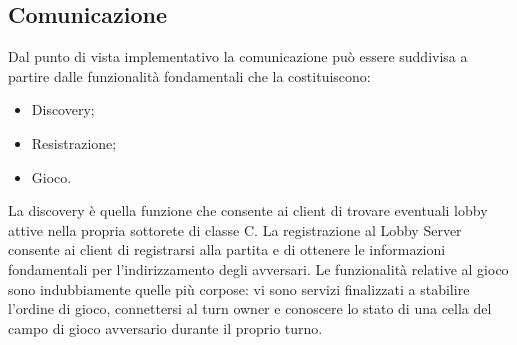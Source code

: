 \subsection{Comunicazione}
Dal punto di vista implementativo la comunicazione può essere suddivisa a 
partire dalle funzionalità fondamentali che la costituiscono:
\begin{itemize}
 \item Discovery;
 \item Resistrazione;
 \item Gioco.
\end{itemize}
La discovery è quella funzione che consente ai client di trovare eventuali 
lobby attive nella propria sottorete di classe C. La registrazione al Lobby 
Server consente ai client di registrarsi alla partita e di ottenere le 
informazioni fondamentali per l'indirizzamento degli avversari. Le funzionalità 
relative al gioco sono indubbiamente quelle più corpose: vi sono servizi 
finalizzati a stabilire l'ordine di gioco, connettersi al turn owner e 
conoscere lo stato di una cella del campo di gioco avversario durante il 
proprio turno.
